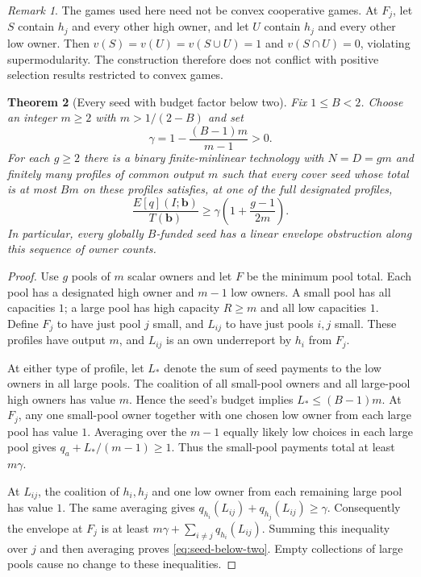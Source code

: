\documentclass[11pt]{article}
\newtheorem{theorem}{Theorem}[section]
\theoremstyle{definition}
\theoremstyle{remark}
\newtheorem{remark}[theorem]{Remark}
\begin{document}
\begin{remark}
The games used here need not be convex cooperative games.  At $F_j$, let
$S$ contain $h_j$ and every other high owner, and let $U$ contain $h_j$
and every other low owner.  Then $v(S)=v(U)=v(S\cup U)=1$ and
$v(S\cap U)=0$, violating supermodularity.  The construction therefore
does not conflict with positive selection results restricted to convex
games.
\end{remark}

\begin{theorem}[Every seed with budget factor below two]
\label{thm:seed-barrier}
Fix $1\le B<2$.  Choose an integer $m\ge2$ with $m>1/(2-B)$ and set
\[
 \gamma=1-\frac{(B-1)m}{m-1}>0.
\]
For each $g\ge2$ there is a binary finite-minlinear technology with
$N=D=gm$ and finitely many profiles of common output $m$ such that every
cover seed whose total is at most $Bm$ on these profiles satisfies, at
one of the full designated profiles,
\begin{equation}
 \frac{E[q](I;\mathbf b)}{T(\mathbf b)}
 \ge \gamma\left(1+\frac{g-1}{2m}\right).
 \label{eq:seed-below-two}
\end{equation}
In particular, every globally $B$-funded seed has a linear envelope
obstruction along this sequence of owner counts.
\end{theorem}
\begin{proof}
Use $g$ pools of $m$ scalar owners and let $F$ be the minimum pool total.
Each pool has a designated high owner and $m-1$ low owners.  A small pool
has all capacities $1$; a large pool has high capacity $R\ge m$ and all
low capacities $1$.  Define $F_j$ to have just pool $j$ small, and
$L_{ij}$ to have just pools $i,j$ small.  These profiles have output $m$,
and $L_{ij}$ is an own underreport by $h_i$ from $F_j$.

At either type of profile, let $L_*$ denote the sum of seed payments to
the low owners in all large pools.  The coalition of all small-pool
owners and all large-pool high owners has value $m$.  Hence the seed's
budget implies $L_*\le(B-1)m$.  At $F_j$, any one small-pool owner together
with one chosen low owner from each large pool has value $1$.  Averaging
over the $m-1$ equally likely low choices in each large pool gives
$q_a+L_* /(m-1)\ge1$.  Thus the small-pool payments total at least
$m\gamma$.

At $L_{ij}$, the coalition of $h_i,h_j$ and one low owner from each
remaining large pool has value $1$.  The same averaging gives
$q_{h_i}(L_{ij})+q_{h_j}(L_{ij})\ge\gamma$.
Consequently the envelope at $F_j$ is at least
$m\gamma+\sum_{i\ne j}q_{h_i}(L_{ij})$.  Summing this inequality over
$j$ and then averaging proves \eqref{eq:seed-below-two}.  Empty collections
of large pools cause no change to these inequalities.
\end{proof}
\end{document}
